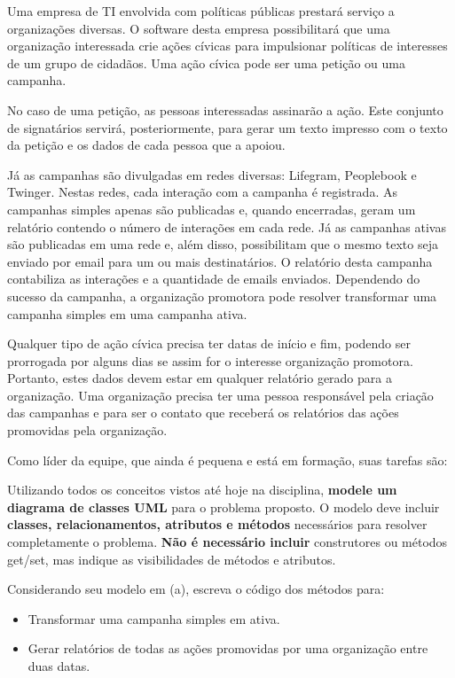 \documentclass{lib/eng_softdoc}
\begin{document}
\makeheader

\problem Uma empresa de TI envolvida com políticas públicas prestará serviço a organizações diversas. O software desta empresa possibilitará que uma organização interessada crie ações cívicas para impulsionar políticas de interesses de um grupo de cidadãos. Uma ação cívica pode ser uma petição ou uma campanha.

No caso de uma petição, as pessoas interessadas assinarão a ação. Este conjunto de signatários servirá, posteriormente, para gerar um texto impresso com o texto da petição e os dados de cada pessoa que a apoiou. 

Já as campanhas são divulgadas em redes diversas: Lifegram, Peoplebook e Twinger. Nestas redes, cada interação com a campanha é registrada. As campanhas simples apenas são publicadas e, quando encerradas, geram um relatório contendo o número de interações em cada rede. Já as campanhas ativas são publicadas em uma rede e, além disso, possibilitam que o mesmo texto seja enviado por email para um ou mais destinatários. O relatório desta campanha contabiliza as interações e a quantidade de emails enviados. Dependendo do sucesso da campanha, a organização promotora pode resolver transformar uma campanha simples em uma campanha ativa. 

Qualquer tipo de ação cívica precisa ter datas de início e fim, podendo ser prorrogada por alguns dias se assim for o interesse organização promotora. Portanto, estes dados devem estar em qualquer relatório gerado para a organização. Uma organização precisa ter uma pessoa responsável pela criação das campanhas e para ser o contato que receberá os relatórios das ações promovidas pela organização.

Como líder da equipe, que ainda é pequena e está em formação, suas tarefas são:
 

\subproblem Utilizando todos os conceitos vistos até hoje na disciplina, \textbf{modele um diagrama de classes UML} para o problema proposto. O modelo deve incluir \textbf{classes, relacionamentos, atributos e métodos} necessários para resolver completamente o problema.
\textbf{Não é necessário incluir} construtores ou métodos get/set, mas indique as visibilidades de métodos e atributos. 

\subproblem Considerando seu modelo em (a), escreva o código dos métodos para:
\begin{itemize}
  \item Transformar uma campanha simples em ativa.
  \item Gerar relatórios de todas as ações promovidas por uma organização entre duas datas.
\end{itemize}
\end{document}
